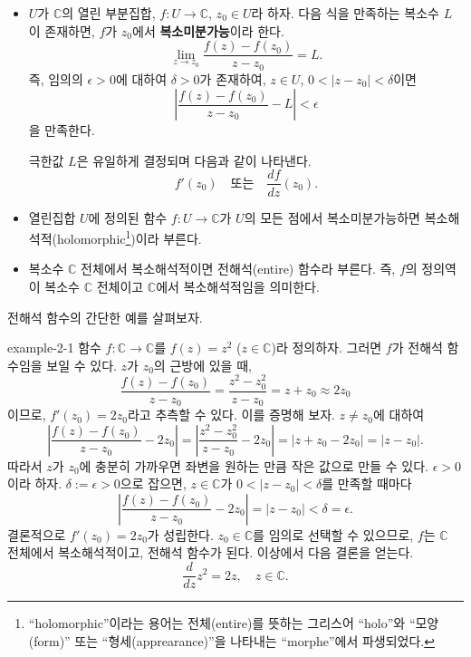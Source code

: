 \begin{saltdefinition} {}{}\label{def-2-1}

\begin{itemize}
\item[(1)] $U$가 $\mathbb C$의 열린 부분집합, $f: U\to \mathbb C$, $z_0\in U$라 하자.
다음 식을 만족하는 복소수 $L$이 존재하면, $f$가 $z_0$에서 {\bf 복소미분가능}이라 한다.
\[
\lim_{z\to z_0} \dfrac{f(z) - f(z_0)}{z - z_0} = L.
\]
즉, 임의의 $\epsilon>0$에 대하여 $\delta>0$가 존재하여,
$z\in U$, $0<|z-z_0|<\delta$이면 
\[
\left| \dfrac{f(z) - f(z_0)}{z - z_0} - L\right| < \epsilon
\]
을 만족한다.

극한값  $L$은 유일하게 결정되며 다음과 같이 나타낸다.
\[
f'(z_0) \quad\text{또는}\quad \dfrac{df}{dz}(z_0).
\]

\item[(2)] 열린집합 $U$에 정의된 함수 $f:U\to\mathbb C$가 $U$의 모든 점에서
복소미분가능하면 복소해석적(holomorphic\footnote{
``holomorphic''이라는 용어는 전체(entire)를 뜻하는 그리스어 ``holo''와
``모양(form)'' 또는 ``형세(apprearance)''을 나타내는 ``morphe''에서 파생되었다.
})이라 부른다.
\item[(3)] 복소수 $\mathbb C$ 전체에서 복소해석적이면 
전해석(entire) 함수라 부른다. 즉, $f$의 정의역이 복소수 $\mathbb C$ 전체이고
$\mathbb C$에서 복소해석적임을 의미한다.
\end{itemize}
\end{saltdefinition}

전해석 함수의 간단한 예를 살펴보자.

\begin{saltexample}[label=example-2-1]{}{example-2-1} 
함수 $f:\mathbb C \to \mathbb C$를 $f(z) = z^2$ ($z\in\mathbb C$)라 정의하자.
그러면 $f$가 전해석 함수임을 보일 수 있다.
$z$가 $z_0$의 근방에 있을 때,
\[
\dfrac{f(z) - f(z_0)}{z - z_0} = \dfrac{z^2 - z_0^2}{z-z_0} = z + z_0 
\approx 2z_0
\]
이므로, $f'(z_0) = 2z_0$라고 추측할 수 있다.
이를 증명해 보자.
$z\ne z_0$에 대하여
\[
\left| \dfrac{f(z) - f(z_0)}{z - z_0} - 2z_0 \right|
= \left| \dfrac{z^2 - z_0^2}{z-z_0} - 2z_0 \right| 
= |z+z_0-2z_0| = |z-z_0|.
\]
따라서 $z$가 $z_0$에 충분히 가까우면
좌변을 원하는 만큼 작은 값으로 만들 수 있다.
$\epsilon>0$이라 하자.
$\delta:=\epsilon>0$으로 잡으면,
$z\in\mathbb C$가 $0<|z-z_0| <\delta$를 만족할 때마다
\[
\left| \dfrac{f(z) - f(z_0)}{z - z_0} - 2z_0 \right|
= |z-z_0| <\delta = \epsilon.
\]
결론적으로 $f'(z_0) = 2z_0$가 성립한다.
$z_0\in\mathbb C$를 임의로 선택할 수 있으므로,
$f$는 $\mathbb C$ 전체에서 복소해석적이고,
전해석 함수가 된다. 이상에서 다음 결론을 얻는다.
\[
\dfrac{d}{dz} z^2 = 2z, \quad z\in \mathbb C.
\]
\end{saltexample}

